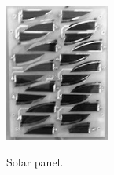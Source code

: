 \documentclass[3p]{elsarticle}
\begin{document}
	\begin{figure}[th]
  	\centering
  	  \begin{minipage}[b]{0.3\textwidth}
		\label{control}
		\centering
		\includegraphics[width=1\linewidth]{./figs/cells}
	    \caption{Solar panel.}
	    

\end{minipage}
\end{figure}
\end{document}
